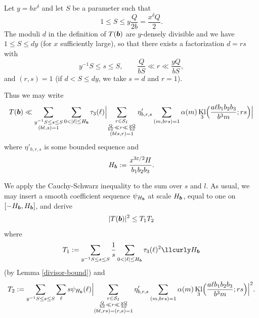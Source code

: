 \documentclass[12pt,a4paper,reqno]{amsart}
\numberwithin{equation}{section}
\DeclareMathOperator{\hypk}{Kl}
\theoremstyle{plain}
\theoremstyle{definition}
\newcommand\eps{\varepsilon}
\newcommand\Scal{\mathcal{S}}
\newcommand{\uple}[1]{\text{\boldmath${#1}$}}
\def\stacksum#1#2{{\stackrel{{\scriptstyle #1}}
{{\scriptstyle #2}}}}
\renewcommand{\lessapprox}{\llcurly}
\begin{document}
Let $y=bx^{\delta}$ and let $S$ be a parameter such that
\begin{equation}\label{q}
  1 \leq S \leq y\frac{Q}{2b}=\frac{x^{\delta}Q}{2}.
\end{equation}
The moduli $d$ in the definition of $T(\uple{b})$ are $y$-densely
divisible and we have $1\leq S\leq dy$ (for $x$ sufficiently large), so that there exists a
factorization $d=rs$ with
$$
y^{-1}S\leq s\leq S,\quad\quad \frac{Q}{bS}\ll r\ll \frac{yQ}{bS},
$$
and $(r,s)=1$ (if $d<S\leq dy$, we take $s=d$ and $r=1$).

Thus we may write
$$
T(\uple{b}) \ll \sum_{\substack{y^{-1} S \leq s \leq S \\ (b\ell,s)=1}} \sum_{0 < |\ell| \leq
  H_{\uple{b}}} \tau_3(\ell)  \Bigl| \sum_{\substack{r \in \Scal_I\\ \frac{Q}{bS}\ll r\ll \frac{yQ}{bS}
	\\ (b
    \ell s,r)=1}} \eta'_{b,r,s} \sum_{ (m,brs)=1} \alpha(m)
\hypk_3\Bigl(\frac{a\ell b_1b_2b_3}{b^3m};rs\Bigr)\Bigr|
$$ 
where $\eta'_{b,r,s}$ is some bounded sequence and
$$ 
H_{\uple{b}} := \frac{x^{3\eps/2} H}{b_1 b_2 b_3}.
$$

We apply the Cauchy-Schwarz inequality to the sum over $s$ and $l$. As
usual, we may insert a smooth coefficient sequence $\psi_{H_{\uple{b}}}$ at scale
$H_{\uple{b}}$, equal to one on $[-H_{\uple{b}},H_{\uple{b}}]$, and
derive
$$
|T(\uple{b})|^2\leq T_1T_2
$$
where
$$
T_1:=\sum_{y^{-1} S \leq s \leq S}\frac{1}{s} \sum_{0 < |\ell| \leq
  H_{\uple{b}}} \tau_3(\ell)^2\lessapprox H_{\uple{b}}
$$
(by Lemma \ref{divisor-bound}) and
$$
T_2:= \sum_{y^{-1} S \leq s \leq S}\sum_{\ell}
s\psi_{H_{\uple{b}}}(\ell)\Bigl|  \sum_{\substack{r \in \Scal_I\\ \frac{Q}{bS}\ll r\ll \frac{yQ}{bS} \\ (b \ell,rs)=(r,s)=1}}
\eta'_{b,r,s} \sum_{ (m,brs)=1} \alpha(m)
\hypk_3\Bigl(\frac{a\ell b_1b_2b_3}{b^3m};rs\Bigr)\Bigr|^2.
$$

\end{document}
